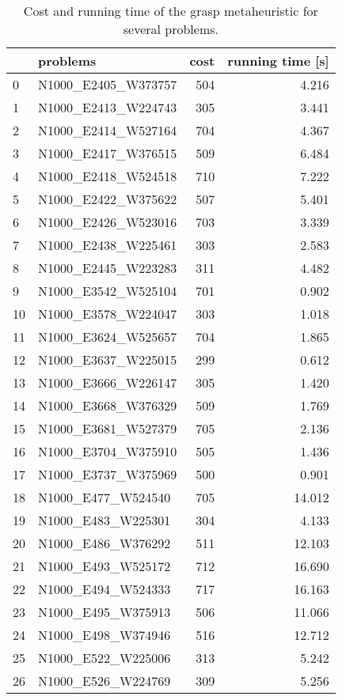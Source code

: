 \begin{table}
\centering
\begin{tabular}{llrr}
\toprule
{} &             problems &  cost &  running time [s] \\
\midrule
0  &  N1000\_E2405\_W373757 &   504 &             4.216 \\
1  &  N1000\_E2413\_W224743 &   305 &             3.441 \\
2  &  N1000\_E2414\_W527164 &   704 &             4.367 \\
3  &  N1000\_E2417\_W376515 &   509 &             6.484 \\
4  &  N1000\_E2418\_W524518 &   710 &             7.222 \\
5  &  N1000\_E2422\_W375622 &   507 &             5.401 \\
6  &  N1000\_E2426\_W523016 &   703 &             3.339 \\
7  &  N1000\_E2438\_W225461 &   303 &             2.583 \\
8  &  N1000\_E2445\_W223283 &   311 &             4.482 \\
9  &  N1000\_E3542\_W525104 &   701 &             0.902 \\
10 &  N1000\_E3578\_W224047 &   303 &             1.018 \\
11 &  N1000\_E3624\_W525657 &   704 &             1.865 \\
12 &  N1000\_E3637\_W225015 &   299 &             0.612 \\
13 &  N1000\_E3666\_W226147 &   305 &             1.420 \\
14 &  N1000\_E3668\_W376329 &   509 &             1.769 \\
15 &  N1000\_E3681\_W527379 &   705 &             2.136 \\
16 &  N1000\_E3704\_W375910 &   505 &             1.436 \\
17 &  N1000\_E3737\_W375969 &   500 &             0.901 \\
18 &   N1000\_E477\_W524540 &   705 &            14.012 \\
19 &   N1000\_E483\_W225301 &   304 &             4.133 \\
20 &   N1000\_E486\_W376292 &   511 &            12.103 \\
21 &   N1000\_E493\_W525172 &   712 &            16.690 \\
22 &   N1000\_E494\_W524333 &   717 &            16.163 \\
23 &   N1000\_E495\_W375913 &   506 &            11.066 \\
24 &   N1000\_E498\_W374946 &   516 &            12.712 \\
25 &   N1000\_E522\_W225006 &   313 &             5.242 \\
26 &   N1000\_E526\_W224769 &   309 &             5.256 \\
\bottomrule
\end{tabular}
\caption{Cost and running time of the grasp metaheuristic for several problems.}
\label{table:grasp-results}
\end{table}

